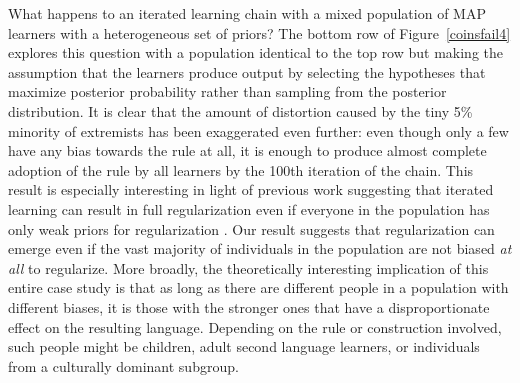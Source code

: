 \documentclass[doc]{apa6}
\begin{document}
What happens to an iterated learning chain with a mixed population of MAP learners with a heterogeneous set of priors? The bottom row of Figure~\ref{coinsfail4} explores this question with a population identical to the top row but making the assumption that the learners produce output by selecting the hypotheses that maximize posterior probability rather than sampling from the posterior distribution. It is clear that the amount of distortion caused by the tiny 5\% minority of extremists has been exaggerated even further: even though only a few have any bias towards the rule at all, it is enough to produce almost complete adoption of the rule by all learners by the 100th iteration of the chain. This result is especially interesting in light of previous work suggesting that iterated learning can result in full regularization even if everyone in the population has only weak priors for regularization  \parencite{smithwonnacott10}. Our result suggests that regularization can emerge even if the vast majority of individuals in the population are not biased {\it at all} to regularize. More broadly, the theoretically interesting implication of this entire case study is that as long as there are different people in a population with different biases, it is those with the stronger ones that have a disproportionate effect on the resulting language. Depending on the rule or construction involved, such people might be children, adult second language learners, or individuals from a culturally dominant subgroup. 



\end{document}
